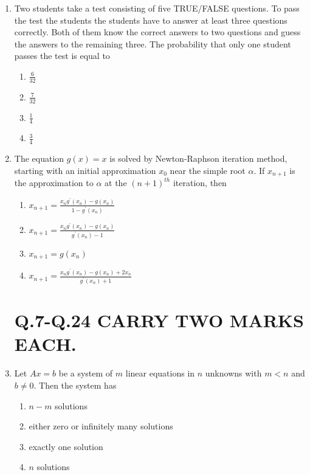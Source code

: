 \documentclass[journal,12pt,twocolumn]{IEEEtran}
\theoremstyle{remark}
\begin{document}
\begin{enumerate}
    \item Two students take a test consisting of five TRUE/FALSE questions. To pass the test the students the students have to answer at least three questions correctly. Both of them know the correct answers to two questions and guess the answers to the remaining three. The probability that only one student passes the test is equal to
        \begin{enumerate}
            \item $\frac{6}{32}$
            \item $\frac{7}{32}$
            \item $\frac{1}{4}$
            \item $\frac{3}{4}$
        \end{enumerate}

    \item The equation $g(x)=x$ is solved by Newton-Raphson iteration method, starting with an initial approximation $x_0$ near the simple root $\alpha$. If $x_{n+1}$ is the approximation to $\alpha$ at the $(n+1)^{th}$ iteration, then
        \begin{enumerate}
            \item $x_{n+1}=\frac{x_ng^\prime(x_n)-g(x_n)}{1-g^\prime(x_n)}$
            \item $x_{n+1}=\frac{x_ng^\prime(x_n)-g(x_n)}{g^\prime(x_n)-1}$
            \item $x_{n+1}=g(x_n)$
            \item $x_{n+1}=\frac{x_ng^\prime(x_n)-g(x_n)+2x_n}{g^\prime(x_n)+1}$
        \end{enumerate}

\bigskip

\section*{Q.7-Q.24 CARRY TWO MARKS EACH.}

\bigskip

    \item Let $Ax=b$ be a system of $m$ linear equations in $n$ unknowns with $m<n$ and $b\neq0$. Then the system has
        \begin{enumerate}
            \item $n-m$ solutions
            \item either zero or infinitely many solutions
            \item exactly one solution
            \item $n$ solutions
        \end{enumerate}



\end{enumerate}
\end{document}
